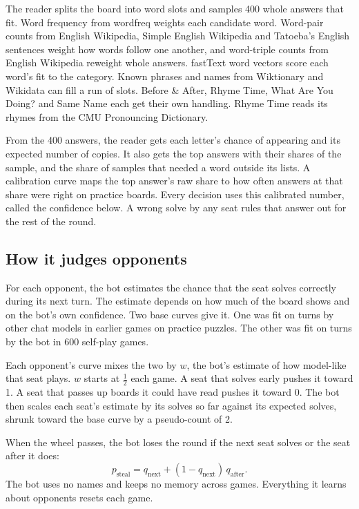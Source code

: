 The reader splits the board into word slots and samples 400 whole answers that fit. Word frequency from wordfreq weights each candidate word. Word-pair counts from English Wikipedia, Simple English Wikipedia and Tatoeba's English sentences weight how words follow one another, and word-triple counts from English Wikipedia reweight whole answers. fastText word vectors score each word's fit to the category. Known phrases and names from Wiktionary and Wikidata can fill a run of slots. Before \& After, Rhyme Time, What Are You Doing? and Same Name each get their own handling. Rhyme Time reads its rhymes from the CMU Pronouncing Dictionary.

From the 400 answers, the reader gets each letter's chance of appearing and its expected number of copies. It also gets the top answers with their shares of the sample, and the share of samples that needed a word outside its lists. A calibration curve maps the top answer's raw share to how often answers at that share were right on practice boards. Every decision uses this calibrated number, called the confidence below. A wrong solve by any seat rules that answer out for the rest of the round.

\subsection{How it judges opponents}\label{app:bot-opponents}

For each opponent, the bot estimates the chance that the seat solves correctly during its next turn. The estimate depends on how much of the board shows and on the bot's own confidence. Two base curves give it. One was fit on turns by other chat models in earlier games on practice puzzles. The other was fit on turns by the bot in 600 self-play games.

Each opponent's curve mixes the two by $w$, the bot's estimate of how model-like that seat plays. $w$ starts at $\tfrac12$ each game. A seat that solves early pushes it toward 1. A seat that passes up boards it could have read pushes it toward 0. The bot then scales each seat's estimate by its solves so far against its expected solves, shrunk toward the base curve by a pseudo-count of 2.

When the wheel passes, the bot loses the round if the next seat solves or the seat after it does:
\[
  p_{\text{steal}} = q_{\text{next}} + (1 - q_{\text{next}})\, q_{\text{after}}.
\]
The bot uses no names and keeps no memory across games. Everything it learns about opponents resets each game.

